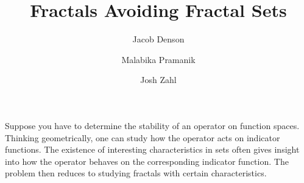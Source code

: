 \documentclass{article}
\title{Fractals Avoiding Fractal Sets}
\author{Jacob Denson\\ \and Malabika Pramanik\\ \and Josh Zahl}
\theoremstyle{plain}
\theoremstyle{plain}
\begin{document}
\maketitle

\begin{multicols}{2}

\begin{abstract}
	\blindtext[1]
\end{abstract}


Suppose you have to determine the stability of an operator on function spaces. Thinking geometrically, one can study how the operator acts on indicator functions. The existence of interesting characteristics in sets often gives insight into how the operator behaves on the corresponding indicator function. The problem then reduces to studying fractals with certain characteristics.
%




\end{multicols}
\end{document}
